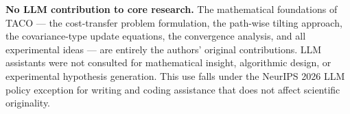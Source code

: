 \documentclass[11pt]{article}
\theoremstyle{definition}
\numberwithin{equation}{section}%
\begin{document}
\noindent\textbf{No LLM contribution to core research.}
The mathematical foundations of TACO --- the cost-transfer problem formulation, the path-wise tilting approach, the covariance-type update equations, the convergence analysis, and all experimental ideas --- are entirely the authors' original contributions.
LLM assistants were not consulted for mathematical insight, algorithmic design, or experimental hypothesis generation.
This use falls under the NeurIPS 2026 LLM policy exception for writing and coding assistance that does not affect scientific originality.




% 

\end{document}
